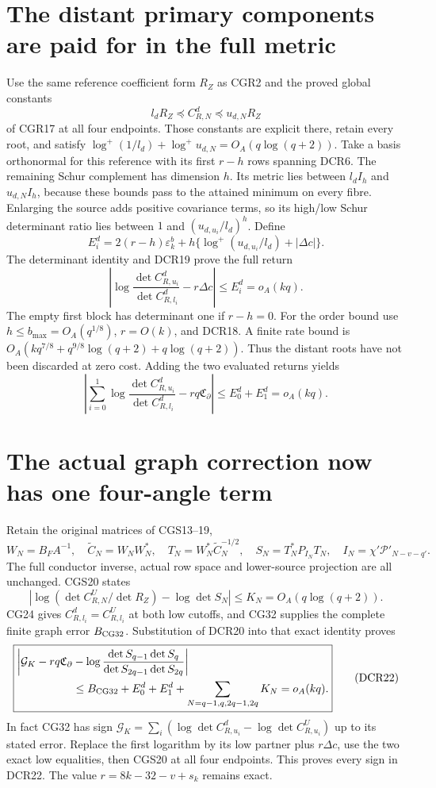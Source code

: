 \documentclass[11pt]{article}
\newcommand{\Pp}{\mathcal P}
\newcommand{\lp}{\log^+}
\begin{document}
\section{The distant primary components are paid for in the full metric}

Use the same reference coefficient form \(R_Z\) as CGR2 and the
proved global constants
\[
 l_d R_Z\preceq C_{R,N}^d\preceq u_{d,N}R_Z
\]
of CGR17 at all four endpoints. Those constants are explicit there,
retain every root, and satisfy
\(\log^+(1/l_d)+\log^+u_{d,N}=O_A(q\log(q+2))\).
Take a basis orthonormal for this reference with its first \(r-h\)
rows spanning DCR6. The remaining Schur complement has dimension
\(h\). Its metric lies between \(l_d I_h\) and \(u_{d,N}I_h\),
because these bounds pass to the attained minimum on every fibre.
Enlarging the source adds positive covariance terms, so its
high/low Schur determinant ratio lies between \(1\) and
\((u_{d,u_i}/l_d)^h\). Define
\[
E_i^d=2(r-h)\varepsilon_k^b+
 h\{\lp(u_{d,u_i}/l_d)+|\Delta c|\}.
\]
The determinant identity and DCR19 prove the full return
\[
\boxed{\left|\log\frac{\det C_{R,u_i}^d}{\det C_{R,l_i}^d}
                   -r\Delta c\right|\le E_i^d=o_A(kq).}
\tag{DCR20}
\]
The empty first block has determinant one if \(r-h=0\).
For the order bound use \(h\le b_{\max}=O_A(q^{1/8})\),
\(r=O(k)\), and DCR18. A finite rate bound is
\(O_A(kq^{7/8}+q^{9/8}\log(q+2)+q\log(q+2))\).
Thus the distant roots have not been discarded at zero cost.
Adding the two evaluated returns yields
\[
\boxed{
\left|\sum_{i=0}^1\log\frac{\det C_{R,u_i}^d}{\det C_{R,l_i}^d}
                 -rq\mathfrak C_\partial\right|
 \le E_0^d+E_1^d=o_A(kq).}
\tag{DCR21}
\]

\section{The actual graph correction now has one four-angle term}

Retain the original matrices of CGS13--19,
\[
W_N=B_FA^{-1},\quad \widetilde C_N=W_NW_N^*,\quad
T_N=W_N^*\widetilde C_N^{-1/2},\quad
S_N=T_N^*P_{I_N}T_N,\quad
I_N=\chi'\Pp'_{N-v-q'}.
\]
The full conductor inverse, actual row space and lower-source
projection are all unchanged. CGS20 states
\[
\left|\log(\det C_{R,N}^U/\det R_Z)-\log\det S_N\right|
 \le K_N=O_A(q\log(q+2)).
\]
CG24 gives \(C_{R,l_i}^d=C_{R,l_i}^U\) at both low cutoffs,
and CG32 supplies the complete finite graph error \(B_{\rm CG32}\).
Substitution of DCR20 into that exact identity proves
\[
\boxed{
\begin{aligned}
\bigg|\mathcal G_K-rq\mathfrak C_\partial
 &-\log\frac{\det S_{q-1}\det S_q}
                 {\det S_{2q-1}\det S_{2q}}\bigg|\\
&\le B_{\rm CG32}+E_0^d+E_1^d+
             \sum_{N=q-1,q,2q-1,2q}K_N=o_A(kq).
\end{aligned}}
\tag{DCR22}
\]
In fact CG32 has sign
\(\mathcal G_K=\sum_i(\log\det C_{R,u_i}^d
-\log\det C_{R,u_i}^U)\) up to its stated error.
Replace the first logarithm by its low partner plus \(r\Delta c\),
use the two exact low equalities, then CGS20 at all four endpoints.
This proves every sign in DCR22. The value
\(r=8k-32-v+s_k\) remains exact.
\end{document}
